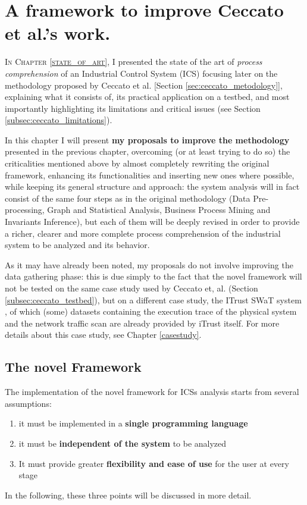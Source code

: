 \chapter{A framework to improve Ceccato et al.’s work.}
\label{proposal}

\linenumbers
\lettrine[lines=2]{I}{n Chapter \ref{state_of_art}}, I presented the state of the art of \textit{process comprehension} of an Industrial Control System (ICS) focusing later on the methodology proposed by Ceccato et al. \cite{ceccato}[Section \ref{sec:ceccato_metodology}], explaining what it consists of, its practical application on a testbed, and most importantly highlighting its limitations and critical issues (see Section \ref{subsec:ceccato_limitations}).

\bigskip
In this chapter I will present \textbf{my proposals to improve the methodology} presented in the previous chapter, overcoming (or at least trying to do so) the criticalities mentioned above by almost completely rewriting the original framework, enhancing its functionalities and inserting new ones where possible, while keeping its general structure and approach: the system analysis will in fact consist of the same four steps as in the original methodology (Data Pre-processing, Graph and Statistical Analysis, Business Process Mining and Invariants Inference), but each of them will be deeply revised in order to provide a richer, clearer and more complete process comprehension of the industrial system to be analyzed and its behavior.

\bigskip
As it may have already been noted, my proposals do not involve improving the data gathering phase: this is due simply to the fact that the novel framework will not be tested on the same case study used by Ceccato et, al. (Section \ref{subsec:ceccato_testbed}), but on a different case study, the ITrust SWaT system \cite{swat_home}, of which (some) datasets containing the execution trace of the physical system and the network traffic scan are already provided by iTrust itself. For more details about this case study, see Chapter \ref{casestudy}.

\section{The novel Framework}
\label{sec:4_framework_presentation}
The implementation of the novel framework for ICSs analysis starts from several assumptions:

\begin{enumerate}
	\item it must be implemented in a \textbf{single programming language}
	\item it must be \textbf{independent of the system} to be analyzed
	\item It must provide greater \textbf{flexibility and ease of use} for the user at every stage
\end{enumerate}
In the following, these three points will be discussed in more detail.

